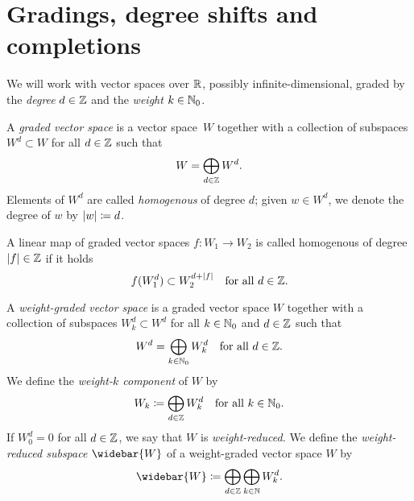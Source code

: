 \documentclass[\MainFolder/Text.tex]{subfiles}
\begin{document}
\section{Gradings, degree shifts and completions
}
\allowdisplaybreaks
\label{Sec:Alg1a}

We will work with vector spaces over $\mathbb{R}$, possibly infinite-dimensional, graded by the \emph{degree} $d\in \mathbb{Z}$ and the \emph{weight} $k\in \mathbb{N}_0$.

\begin{Definition}\label{Def:Grading}
A \emph{graded vector space} is a vector space~$W$ together with a collection  of subspaces $W^d \subset W$ for all $d\in \mathbb{Z}$ such that
\[ W=\bigoplus_{d\in \mathbb{Z}} W^d. \]
Elements of $W^d$ are called \emph{homogenous} of degree $d$; given $w\in W^d$, we denote the degree of $w$ by $|w| \coloneqq d$. 

A linear map of graded vector spaces $f: W_1 \rightarrow W_2$ is called homogenous of degree $|f| \in \mathbb{Z}$ if it holds 
\begin{equation}\label{Eq:StdGrading}
f(W_1^d)\subset W_2^{d+|f|}\quad\text{for all }d\in \mathbb{Z}.
\end{equation}

A \emph{weight-graded vector space} is a graded vector space $W$ together with a collection of subspaces $W_k^d \subset W^d$ for all $k\in \mathbb{N}_0$ and $d\in \mathbb{Z}$ such that
\[ W^d=\bigoplus_{k\in\mathbb{N}_0} W_k^d\quad\text{for all }d\in \mathbb{Z}. \]
We define the \emph{weight-$k$ component} of $W$ by
\[ W_k \coloneqq \bigoplus_{d\in \mathbb{Z}} W_k^d\quad\text{for all }k\in \mathbb{N}_0. \]
If $W_0^d = 0$ for all $d\in \mathbb{Z}$, we say that $W$ is \emph{weight-reduced.} We define the \emph{weight-reduced subspace} $\widebar{W}$ of a weight-graded vector space $W$ by
\[ \widebar{W} \coloneqq \bigoplus_{d\in \Z} \bigoplus_{k\in\N} W_k^d. \] 



\end{Definition}
\end{document}

